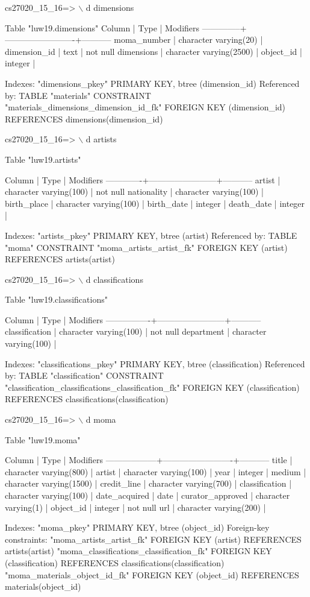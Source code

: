 \documentclass[journal,transmag]{IEEEtran}
\begin{document}
cs27020\_15\_16=> $\backslash$ d dimensions


              Table "luw19.dimensions"
    Column    |          Type           | Modifiers
--------------+-------------------------+-----------
 moma\_number  | character varying(20)   |
 dimension\_id | text                    | not null
 dimensions   | character varying(2500) |
 object\_id    | integer                 |


Indexes:
    "dimensions\_pkey" PRIMARY KEY, btree (dimension\_id)
Referenced by:
    TABLE "materials" CONSTRAINT "materials\_dimensions\_dimension\_id\_fk" FOREIGN KEY (dimension\_id) REFERENCES dimensions(dimension\_id)


cs27020\_15\_16=> $\backslash$ d artists

              Table "luw19.artists"

   Column    |          Type          | Modifiers
-------------+------------------------+-----------
 artist      | character varying(100) | not null
 nationality | character varying(100) |
 birth\_place | character varying(100) |
 birth\_date  | integer                |
 death\_date  | integer                |


Indexes:
    "artists\_pkey" PRIMARY KEY, btree (artist)
Referenced by:
    TABLE "moma" CONSTRAINT "moma\_artists\_artist\_fk" FOREIGN KEY (artist) REFERENCES artists(artist)


cs27020\_15\_16=> $\backslash$ d classifications


            Table "luw19.classifications"

     Column     |          Type          | Modifiers
----------------+------------------------+-----------
 classification | character varying(100) | not null
 department     | character varying(100) |


Indexes:
    "classifications\_pkey" PRIMARY KEY, btree (classification)
Referenced by:
    TABLE "classification" CONSTRAINT "classification\_classifications\_classification\_fk" FOREIGN KEY (classification) REFERENCES classifications(classification)


cs27020\_15\_16=> $\backslash$ d moma


                   Table "luw19.moma"

      Column      |          Type           | Modifiers
------------------+-------------------------+-----------
 title            | character varying(800)  |
 artist           | character varying(100)  |
 year             | integer                 |
 medium           | character varying(1500) |
 credit\_line      | character varying(700)  |
 classification   | character varying(100)  |
 date\_acquired    | date                    |
 curator\_approved | character varying(1)    |
 object\_id        | integer                 | not null
 url              | character varying(200)  |


Indexes:
    "moma\_pkey" PRIMARY KEY, btree (object\_id)
Foreign-key constraints:
    "moma\_artists\_artist\_fk" FOREIGN KEY (artist) REFERENCES artists(artist)
    "moma\_classifications\_classification\_fk" FOREIGN KEY (classification) REFERENCES classifications(classification)
    "moma\_materials\_object\_id\_fk" FOREIGN KEY (object\_id) REFERENCES materials(object\_id)
\end{document}
